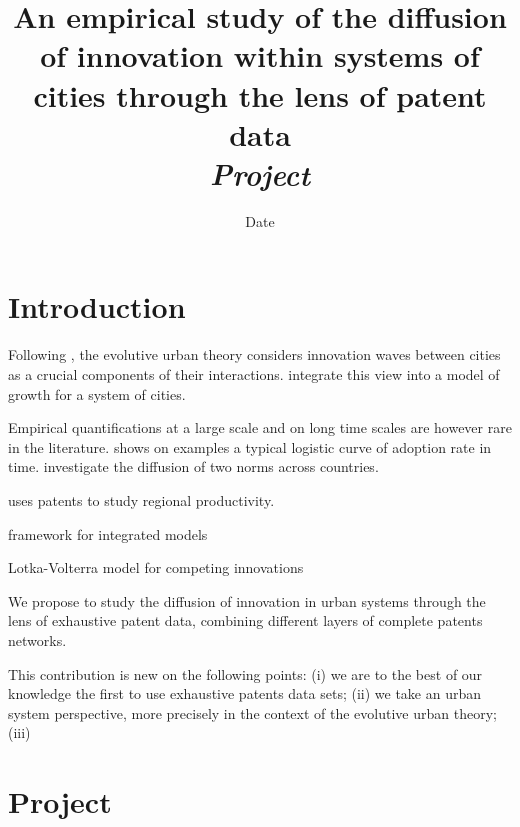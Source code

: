 


\title{An empirical study of the diffusion of innovation within systems of cities through the lens of patent data\\
\textit{Project}
}
\author{}
\date{Date}


\maketitle

\justify


\begin{abstract}

\end{abstract}




\section{Introduction}

Following \cite{hagerstrand1968innovation}, the evolutive urban theory considers innovation waves between cities as a crucial components of their interactions. \cite{favaro2011gibrat} integrate this view into a model of growth for a system of cities.

Empirical quantifications at a large scale and on long time scales are however rare in the literature. \cite{grubler1996time} shows on examples a typical logistic curve of adoption rate in time. \cite{albuquerque2007spatiotemporal} investigate the diffusion of two norms across countries.

\cite{acs2002patents} uses patents to study regional productivity.

\cite{wejnert2002integrating} framework for integrated models

\cite{sonis1983spatio} Lotka-Volterra model for competing innovations

We propose to study the diffusion of innovation in urban systems through the lens of exhaustive patent data, combining different layers of complete patents networks.

This contribution is new on the following points: (i) we are to the best of our knowledge the first to use exhaustive patents data sets; (ii) we take an urban system perspective, more precisely in the context of the evolutive urban theory; (iii)


\section{Project}

